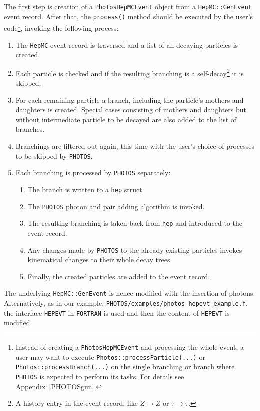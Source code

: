 \documentclass[]{Photos_interface_design}
\begin{document}
The first step is creation of a {\tt PhotosHepMCEvent} object from
a {\tt HepMC::GenEvent} event record. After that, the {\tt process()} method should
be executed by the user's code\footnote{Instead of creating a {\tt PhotosHepMCEvent} and processing the whole event,
a user may want to execute {\tt Photos::processParticle(...)} or {\tt Photos::processBranch(...)}
on the single branching  or branch where {\tt PHOTOS} is expected to perform its tasks.
For details see Appendix~\ref{PHOTOSgun}.
}, invoking the following process:

\begin{enumerate}
\item The {\tt HepMC} event record is traversed and a list of all decaying
      particles is created.
\item Each particle is checked and if the resulting branching is a self-decay\footnote{A history entry in the event record, like
      $Z\to Z$ or $\tau \to \tau$.} it is skipped.
\item For each remaining particle a branch,  including the particle's mothers and daughters
      is created. Special cases consisting of mothers and daughters but without  intermediate particle 
to be decayed are also added to the 
	  list of branches.
\item Branchings are filtered out again, this time with  the user's choice of processes
      to be skipped by {\tt PHOTOS}.
\item Each branching is processed by {\tt PHOTOS} separately:

	\begin{enumerate}
  
	\item The branch is written to a {\tt hep} struct.
	\item The {\tt PHOTOS} photon and pair adding algorithm is invoked. 
	\item The resulting branching is taken back from {\tt hep} and introduced to the event record.
	\item Any changes made by {\tt PHOTOS} to the already existing particles
          invokes kinematical changes to their whole decay trees.
	\item Finally, the created particles are added to the event record.
	\end{enumerate}

\end{enumerate}

The underlying {\tt HepMC::GenEvent} is hence modified with the  insertion of photons.
Alternatively, as in our example, {\tt PHOTOS/examples/photos\_hepevt\_example.f}, the interface {\tt HEPEVT} in {\tt FORTRAN} is used 
and then the content of  {\tt HEPEVT} is modified.
\end{document}
